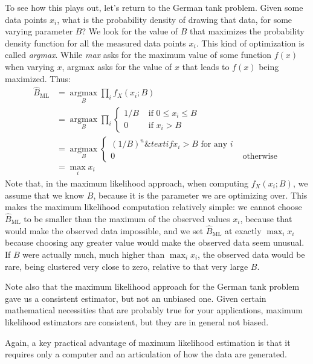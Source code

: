 To see how this plays out, let's return to the German tank problem. Given some data
points $x_i$, what is the probability density of drawing that data, for some varying
parameter $B$? We look for the value of $B$ that maximizes the probability density
function for all the measured data points $x_i$. This kind of optimization is called \emph{argmax}. While \emph{max} asks for the maximum value of some function $f(x)$ when varying $x$, argmax asks for the value of $x$ that leads to $f(x)$ being maximized. Thus:
\begin{align*}
    \hat{B}_\mathrm{ML}
    &= \underset{B}{\operatorname{argmax}} \prod_i f_X(x_i; B) \\
    &= \underset{B}{\operatorname{argmax}} \prod_i \begin{cases}
      1/B &\text{ if } 0 \leq x_i \leq B \\
      0 &\text{ if } x_i > B
    \end{cases} \\
    &= \underset{B}{\operatorname{argmax}} \begin{cases}
      (1/B)^n \&text{ if } x_i > B \text{ for any $i$} \\
      0 &\text{ otherwise}
     \end{cases} \\
    &= \max_i x_i
\end{align*}
Note that, in the maximum likelihood approach, when computing $f_X(x_i; B)$, we assume that we know $B$, because it is the parameter we are optimizing over. This makes the maximum likelihood computation relatively simple: we cannot choose $\hat{B}_\mathrm{ML}$ to be smaller than the maximum of the observed values $x_i$, because that would make the observed data impossible, and we set $\hat{B}_\mathrm{ML}$ at exactly $\max_i x_i$ because choosing any greater value would make the observed data seem unusual. If $B$ were actually much, much higher than $\max_i x_i$, the observed data would be rare, being clustered very close to zero, relative to that very large $B$.

Note also that the maximum likelihood approach for the German tank problem gave us a consistent estimator, but not an unbiased one. Given certain mathematical necessities that are probably true for your applications, maximum likelihood estimators are consistent, but they are in general not biased.

Again, a key practical advantage of maximum likelihood estimation is that it requires only a computer and an articulation of how the data are generated.


